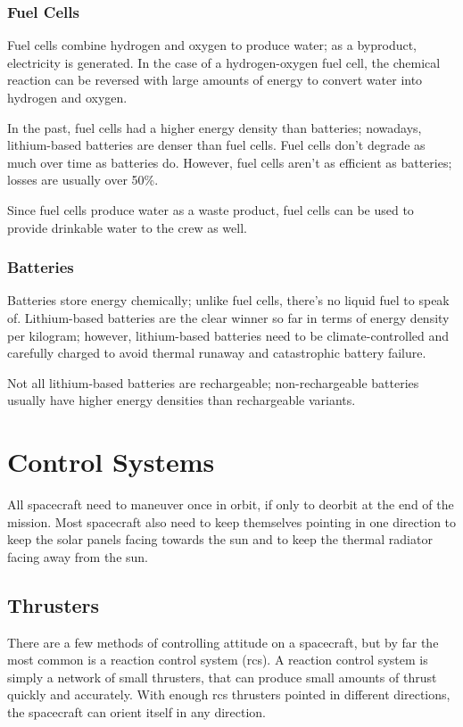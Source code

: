 \subsubsection{Fuel Cells}

Fuel cells combine hydrogen and oxygen to produce water; as a
byproduct, electricity is generated. In the case of a hydrogen-oxygen
fuel cell, the chemical reaction can be reversed with large amounts of
energy to convert water into hydrogen and oxygen.

In the past, fuel cells had a higher energy density than batteries;
nowadays, lithium-based batteries are denser than fuel cells. Fuel
cells don't degrade as much over time as batteries do. However, fuel
cells aren't as efficient as batteries; losses are usually over 50\%.

Since fuel cells produce water as a waste product, fuel cells can be
used to provide drinkable water to the crew as well.

\subsubsection{Batteries}

Batteries store energy chemically; unlike fuel cells, there's no
liquid fuel to speak of. Lithium-based batteries are the clear winner
so far in terms of energy density per kilogram; however, lithium-based
batteries need to be climate-controlled and carefully charged to avoid
thermal runaway and catastrophic battery failure.

Not all lithium-based batteries are rechargeable; non-rechargeable
batteries usually have higher energy densities than rechargeable
variants.

\section{Control Systems}

All spacecraft need to maneuver once in orbit, if only to deorbit at
the end of the mission. Most spacecraft also need to keep themselves
pointing in one direction to keep the solar panels facing towards the
sun and to keep the thermal radiator facing away from the sun.

\subsection{Thrusters}

There are a few methods of controlling attitude on a spacecraft, but
by far the most common is a reaction control system
(\acrshort{rcs}). A reaction control system is simply a network of
small thrusters, that can produce small amounts of thrust quickly and
accurately. With enough \acrshort{rcs} thrusters pointed in different
directions, the spacecraft can orient itself in any direction.

